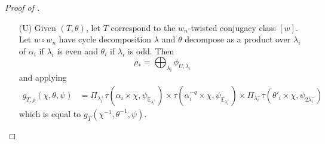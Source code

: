 \documentclass[12pt, reqno]{amsart}
\theoremstyle{definition}
\theoremstyle{definition}
\theoremstyle{definition}
\newcommand{\fieldCharacter}{\psi}
\newcommand{\FieldNorm}[2]{\mathrm{N}_{#1:#2}}
\newcommand{\quadraticExtension}{\mathbb{E}}
\newcommand{\quadraticFieldExtension}[1]{\quadraticExtension_{#1}}
\newcommand{\GaussSumCharacter}[3]{\tau\left(#1 \times #2, #3\right)}
\newcommand{\algebraicGroup}[1]{\boldsymbol{\mathrm{#1}}}
\newcommand{\calvin}[1]{\textcolor{orange}{\sffamily ((CALVIN: #1))}}
\begin{document}
\begin{proof}[Proof of ]
\begin{enumerate}
    \item[($\algebraicGroup{U}$)] Given $(T,\theta)$, let $T$ correspond to the $w_n$-twisted conjugacy class $[w]$. Let $w \circ w_n$ have cycle decomposition $\lambda$ 
	and $\theta$ decompose as a product over $\lambda_i$ of $\alpha_i$ if $\lambda_i$ is even and $\theta_i$ if $\lambda_i$ is odd. Then
	$$\rho_* = \bigoplus_{\lambda_i} \phi_{U,\lambda_i}$$
	and applying 
    \begin{align*}
		g_{T,\rho}(\chi,\theta,\psi) &= \Pi_{\lambda_i^+} \GaussSumCharacter{\alpha_i}{\chi}{\fieldCharacter_{\quadraticFieldExtension{\lambda_i^+}}} \times \GaussSumCharacter{\alpha_i^{-q}}{\chi}{\fieldCharacter_{\quadraticFieldExtension{\lambda_i^+}}} \times \Pi_{\lambda_i^-} \GaussSumCharacter{\theta'_i}{\chi}{\fieldCharacter_{2\lambda_i^-}} 
	\end{align*}
	which is equal to $g_{T}(\chi^{-1},\theta^{-1},\psi)$.
	\begin{comment}old hacky version
	\calvin{right now can only deal with the case that $\chi$ is a square} Given $(T,\theta)$, let $T$ correspond to the $w_n$-twisted conjugacy class $[w]$. Let $w \circ w_n$ have cycle decomposition $\lambda$ 
	and $\theta$ decompose as a product over $\lambda_i$ of $\alpha_i$ if $\lambda_i$ is even and $\theta_i$ if $\lambda_i$ is odd. 
	Write $\chi = \chi'+\chi_{\mathbb{F}}\circ \FieldNorm{\quadraticExtension}{\mathbb{F}}$ and $\chi'^{-1} = (\chi')^c$. 
	Then
	$$\rho_* = \bigoplus_{\lambda_i} \phi_{U,\lambda_i}$$
	and applying \Cref{lem:cochar_computation}
	\begin{align*}
		g_{T,\rho}(\chi,\theta,\psi) &= \Pi_{\lambda_i} \begin{cases}
			\GaussSumCharacter{\left(\alpha_i \times \chi'\right)}{\left(\chi_{\mathbb{F}}\circ \FieldNorm{\quadraticExtension}{\mathbb{F}}\right)}{\fieldCharacter_{\quadraticFieldExtension{\lambda_i/2}}} \times \GaussSumCharacter{\left(\alpha_i^{-1}\times \chi'^c\right)}{\left(\chi_{\mathbb{F}}\circ \FieldNorm{\quadraticExtension}{\mathbb{F}}\right)}{\fieldCharacter_{\quadraticFieldExtension{\lambda_i/2}}} & \lambda_i \textnormal{ even} \\
			\GaussSumCharacter{\left(\theta'_i \times \chi'\right)}{\left(\chi_{\mathbb{F}}\circ \FieldNorm{\quadraticExtension}{\mathbb{F}}\right)}{\fieldCharacter_{2\lambda_i}} & \lambda_i \textnormal{ odd}
		\end{cases}
	\end{align*}
	which is equal to $g_{T}(\chi^{-1},\theta^{-1},\psi)$.\

\end{comment}
\end{enumerate}
\end{proof}
\end{document}

